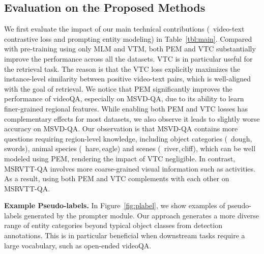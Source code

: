 \documentclass[10pt,twocolumn,letterpaper]{article}
\begin{document}
\vspace{-1ex}
\subsection{Evaluation on the Proposed Methods}\label{sec:exp-method}
\vspace{-0.5ex}
We first evaluate the impact of our main technical contributions (\ie~video-text contrastive loss and prompting entity modeling) in Table~\ref{tbl:main}.
Compared with pre-training using only MLM and VTM, both PEM and VTC substantially improve the performance across all the datasets.
VTC is in particular useful for the retrieval task. The reason is that the VTC loss explicitly maximizes the instance-level similarity between positive video-text pairs, which is well-aligned with the goal of retrieval.
We notice that PEM significantly improves the performance of videoQA, especially on MSVD-QA,
due to its ability to learn finer-grained regional features.
While enabling both PEM and VTC losses has complementary effects for most datasets, we also observe it leads to slightly worse accuracy on MSVD-QA.
Our observation is that MSVD-QA contains more questions requiring region-level knowledge, including object categories (\eg~dough, swords), animal species (\eg~hare,\,eagle) and scenes (\eg~river,\,cliff), which can be well modeled using PEM, rendering the impact of VTC negligible. In contrast, MSRVTT-QA involves more coarse-grained visual information such as activities.
As a result, using both PEM and VTC complements with each other on MSRVTT-QA.

\noindent\textbf{Example Pseudo-labels.} In Figure~\ref{fig:plabel}, we show examples of pseudo-labels generated by the prompter module. Our approach generates a more diverse range of entity categories beyond typical object classes from detection annotations. This is in particular beneficial when downstream tasks require a large vocabulary, such as open-ended videoQA.

\vspace{-1ex}
\end{document}
